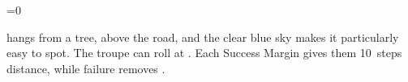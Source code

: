 \ifnum\value{cycle}=0


 hangs from a tree, above the road, and the clear blue sky makes it particularly easy to spot.
The troupe can roll  at \tn[10].
Each Success Margin gives them 10~\glspl{step} distance, while failure removes .

\woodspy

\fi

